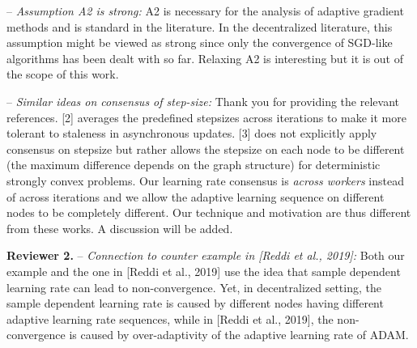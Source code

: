\documentclass{article}
\begin{document}
-- \textit{Assumption A2 is strong:}
A2 is necessary for the analysis of adaptive gradient methods and is standard in the literature.
In the decentralized literature, this assumption might be viewed as strong since only the convergence of SGD-like algorithms has been dealt with so far.
Relaxing A2 is interesting but it is out of the scope of this work. \vspace{-5pt}

-- \textit{Similar ideas on consensus of step-size:}
Thank you for providing the relevant references. 
[2] averages the predefined stepsizes across iterations to make it more tolerant to staleness in asynchronous updates.  
[3] does not explicitly apply consensus on stepsize but rather allows the stepsize on each node to be different (the maximum difference depends on the graph structure) for deterministic strongly convex problems. 
Our learning rate consensus is \emph{across workers} instead of across iterations and we allow the adaptive learning sequence on different nodes to be completely different. 
Our technique and motivation are thus different from these works. 
A discussion will be added.


\vspace{-2pt}

\textbf{Reviewer 2.}
-- \textit{Connection to counter example in [Reddi et al., 2019]:}
Both our example and the one in [Reddi et al., 2019] use the idea that sample dependent learning rate can lead to non-convergence. 
Yet, in decentralized setting, the sample dependent learning rate is caused by different nodes having different adaptive learning rate sequences, while in [Reddi et al., 2019], the non-convergence is caused by over-adaptivity of the adaptive learning rate of ADAM. 

\end{document}
